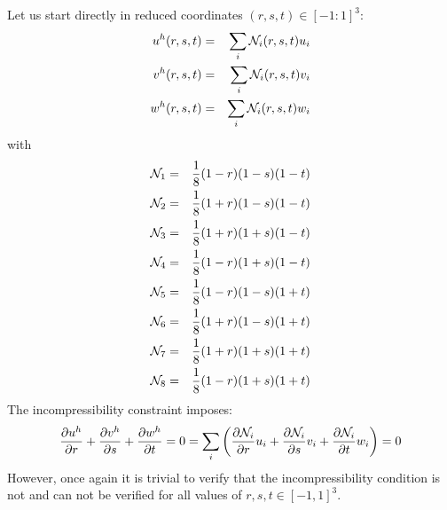 Let us start directly in reduced coordinates $(r,s,t)\in [-1:1]^3$:
\begin{eqnarray}
u^h(r,s,t)&=&\sum_i {\mathcal{N}}_i(r,s,t) u_i\nonumber\\
v^h(r,s,t)&=&\sum_i {\mathcal{N}}_i(r,s,t) v_i\nonumber\\
w^h(r,s,t)&=&\sum_i {\mathcal{N}}_i(r,s,t) w_i\nonumber
\end{eqnarray}
with
\begin{eqnarray}
{\mathcal{N}}_1&=&\frac{1}{8} (1-r)(1-s)(1-t) \nonumber\\ 
{\mathcal{N}}_2&=&\frac{1}{8} (1+r)(1-s)(1-t) \nonumber\\ 
{\mathcal{N}}_3&=&\frac{1}{8} (1+r)(1+s)(1-t) \nonumber\\ 
{\mathcal{N}}_4&=&\frac{1}{8} (1-r)(1+s)(1-t) \nonumber\\ 
{\mathcal{N}}_5&=&\frac{1}{8} (1-r)(1-s)(1+t) \nonumber\\ 
{\mathcal{N}}_6&=&\frac{1}{8} (1+r)(1-s)(1+t) \nonumber\\ 
{\mathcal{N}}_7&=&\frac{1}{8} (1+r)(1+s)(1+t) \nonumber\\ 
{\mathcal{N}}_8&=&\frac{1}{8} (1-r)(1+s)(1+t) \nonumber
\end{eqnarray}
The incompressibility constraint imposes:
\[
\frac{\partial u^h}{\partial r}+
\frac{\partial v^h}{\partial s}+
\frac{\partial w^h}{\partial t}=0
=
\sum_i \left(  
\frac{\partial {\mathcal{N}}_i}{\partial r} u_i+
\frac{\partial {\mathcal{N}}_i}{\partial s} v_i+
\frac{\partial {\mathcal{N}}_i}{\partial t} w_i
\right)
=0
\]
However, once again it is trivial to verify that the incompressibility
condition is not and can not be verified for all values of
$r,s,t \in [-1,1]^3$.

